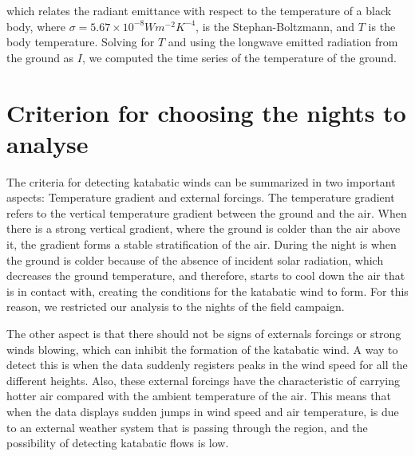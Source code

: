 \noindent which relates the radiant emittance with respect to the temperature of a black body, where $\sigma = 5.67 \times 10^{-8} W m^{-2} K^{-4}$, is the Stephan-Boltzmann, and $T$ is the body temperature. Solving for $T$ and using the longwave emitted radiation from the ground as $I$, we computed the time series of the temperature of the ground.




\section{Criterion for choosing the nights to analyse}

The criteria for detecting katabatic winds can be summarized in two important aspects: Temperature gradient and external forcings. The temperature gradient refers to the vertical temperature gradient between the ground and the air. When there is a strong vertical gradient, where the ground is colder than the air above it, the gradient forms a stable stratification of the air. During the night is when the ground is colder because of the absence of incident solar radiation, which decreases the ground temperature, and therefore, starts to cool down the air that is in contact with, creating the conditions for the katabatic wind to form. For this reason, we restricted our analysis to the nights of the field campaign. 

The other aspect is that there should not be signs of externals forcings or strong winds blowing, which can inhibit the formation of the katabatic wind. A way to detect this is when the data suddenly registers peaks in the wind speed for all the different heights. Also, these external forcings have the characteristic of carrying hotter air compared with the ambient temperature of the air. This means that when the data displays sudden jumps in wind speed and air temperature, is due to an external weather system that is passing through the region, and the possibility of detecting katabatic flows is low.

